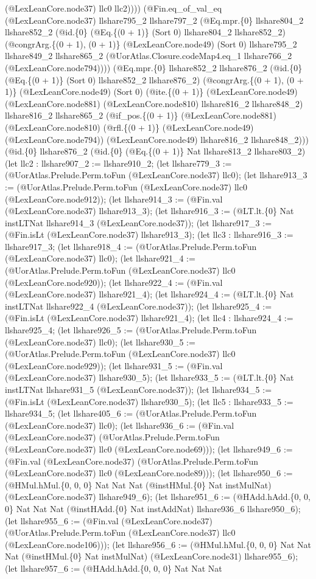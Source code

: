 \documentclass[11pt]{article}
\begin{document}
(@LexLeanCore.node37) llc0 llc2)))) (@Fin.eq\_of\_val\_eq (@LexLeanCore.node37) llshare795\_2 llshare797\_2 (@Eq.mpr.\{0\} llshare804\_2 llshare852\_2 (@id.\{0\} (@Eq.\{(0 + 1)\} (Sort 0) llshare804\_2 llshare852\_2) (@congrArg.\{(0 + 1), (0 + 1)\} (@LexLeanCore.node49) (Sort 0) llshare795\_2 llshare849\_2 llshare865\_2 (@UorAtlas.Closure.codeMap4.eq\_1 llshare766\_2 (@LexLeanCore.node794)))) (@Eq.mpr.\{0\} llshare852\_2 llshare876\_2 (@id.\{0\} (@Eq.\{(0 + 1)\} (Sort 0) llshare852\_2 llshare876\_2) (@congrArg.\{(0 + 1), (0 + 1)\} (@LexLeanCore.node49) (Sort 0) (@ite.\{(0 + 1)\} (@LexLeanCore.node49) (@LexLeanCore.node881) (@LexLeanCore.node810) llshare816\_2 llshare848\_2) llshare816\_2 llshare865\_2 (@if\_pos.\{(0 + 1)\} (@LexLeanCore.node881) (@LexLeanCore.node810) (@rfl.\{(0 + 1)\} (@LexLeanCore.node49) (@LexLeanCore.node794)) (@LexLeanCore.node49) llshare816\_2 llshare848\_2))) (@id.\{0\} llshare876\_2 (@id.\{0\} (@Eq.\{(0 + 1)\} Nat llshare813\_2 llshare803\_2) (let llc2 : llshare907\_2 := llshare910\_2; (let llshare779\_3 := (@UorAtlas.Prelude.Perm.toFun (@LexLeanCore.node37) llc0); (let llshare913\_3 := (@UorAtlas.Prelude.Perm.toFun (@LexLeanCore.node37) llc0 (@LexLeanCore.node912)); (let llshare914\_3 := (@Fin.val (@LexLeanCore.node37) llshare913\_3); (let llshare916\_3 := (@LT.lt.\{0\} Nat instLTNat llshare914\_3 (@LexLeanCore.node37)); (let llshare917\_3 := (@Fin.isLt (@LexLeanCore.node37) llshare913\_3); (let llc3 : llshare916\_3 := llshare917\_3; (let llshare918\_4 := (@UorAtlas.Prelude.Perm.toFun (@LexLeanCore.node37) llc0); (let llshare921\_4 := (@UorAtlas.Prelude.Perm.toFun (@LexLeanCore.node37) llc0 (@LexLeanCore.node920)); (let llshare922\_4 := (@Fin.val (@LexLeanCore.node37) llshare921\_4); (let llshare924\_4 := (@LT.lt.\{0\} Nat instLTNat llshare922\_4 (@LexLeanCore.node37)); (let llshare925\_4 := (@Fin.isLt (@LexLeanCore.node37) llshare921\_4); (let llc4 : llshare924\_4 := llshare925\_4; (let llshare926\_5 := (@UorAtlas.Prelude.Perm.toFun (@LexLeanCore.node37) llc0); (let llshare930\_5 := (@UorAtlas.Prelude.Perm.toFun (@LexLeanCore.node37) llc0 (@LexLeanCore.node929)); (let llshare931\_5 := (@Fin.val (@LexLeanCore.node37) llshare930\_5); (let llshare933\_5 := (@LT.lt.\{0\} Nat instLTNat llshare931\_5 (@LexLeanCore.node37)); (let llshare934\_5 := (@Fin.isLt (@LexLeanCore.node37) llshare930\_5); (let llc5 : llshare933\_5 := llshare934\_5; (let llshare405\_6 := (@UorAtlas.Prelude.Perm.toFun (@LexLeanCore.node37) llc0); (let llshare936\_6 := (@Fin.val (@LexLeanCore.node37) (@UorAtlas.Prelude.Perm.toFun (@LexLeanCore.node37) llc0 (@LexLeanCore.node69))); (let llshare949\_6 := (@Fin.val (@LexLeanCore.node37) (@UorAtlas.Prelude.Perm.toFun (@LexLeanCore.node37) llc0 (@LexLeanCore.node89))); (let llshare950\_6 := (@HMul.hMul.\{0, 0, 0\} Nat Nat Nat (@instHMul.\{0\} Nat instMulNat) (@LexLeanCore.node37) llshare949\_6); (let llshare951\_6 := (@HAdd.hAdd.\{0, 0, 0\} Nat Nat Nat (@instHAdd.\{0\} Nat instAddNat) llshare936\_6 llshare950\_6); (let llshare955\_6 := (@Fin.val (@LexLeanCore.node37) (@UorAtlas.Prelude.Perm.toFun (@LexLeanCore.node37) llc0 (@LexLeanCore.node106))); (let llshare956\_6 := (@HMul.hMul.\{0, 0, 0\} Nat Nat Nat (@instHMul.\{0\} Nat instMulNat) (@LexLeanCore.node31) llshare955\_6); (let llshare957\_6 := (@HAdd.hAdd.\{0, 0, 0\} Nat Nat Nat 
\end{document}
